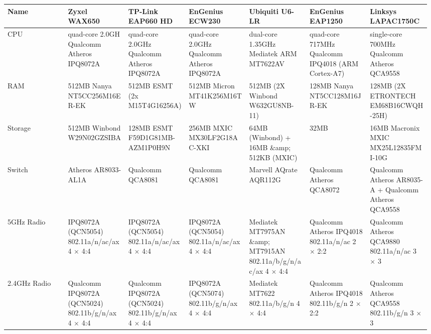 \documentclass[a4paper,12pt]{report}
\begin{document}
\begin{table}[!ht]
  \centering
  \singlespace
  \footnotesize
  \begin{tabular}{*{7}{|p{0.14\linewidth}}|} %
      \hline
      Name &
      Zyxel WAX650 &
      TP-Link EAP660 HD &
      EnGenius ECW230 &
      Ubiquiti U6-LR &
      EnGenius EAP1250 &
      Linksys LAPAC1750C \\

      \hline
      CPU &
      quad-core 2.0GH Qualcomm Atheros IPQ8072A &
      quad-core 2.0GHz Qualcomm Atheros IPQ8072A &
      quad-core 2.0GHz Qualcomm Atheros IPQ8072A &
      dual-core 1.35GHz Mediatek ARM MT7622AV  &
      quad-core 717MHz Qualcomm IPQ4018 (ARM Cortex-A7) &
      single-core 700MHz Qualcomm Atheros QCA9558 \\

      \hline
      RAM &
      512MB Nanya NT5CC256M16ER-EK &
      512MB ESMT (2x M15T4G16256A) &
      512MB Micron MT41K256M16TW &
      512MB (2X Winbond W632GU8NB-11) &
      128MB Nanya NT5CC128M16JR-EK &
      128MB (2X ETRONTECH EM68B16CWQH-25H) \\

      \hline
      Storage &
      512MB Winbond W29N02GZSIBA &
      128MB ESMT F59D1G81MB-AZM1P0H9N &
      256MB MXIC MX30LF2G18AC-XKI &
      64MB (Winbond) + 16MB \&amp; 512KB (MXIC) &
      32MB &
      16MB Macronix MXIC MX25L12835FMI-10G \\

      \hline
      Switch &
      Atheros AR8033-AL1A &
      Qualcomm QCA8081 &
      Qualcomm QCA8081 &
      Marvell AQrate AQR112G &
      Qualcomm Atheros QCA8072 & 
      Qualcomm Atheros AR8035-A + Qualcomm Atheros QCA9558 \\

      \hline
      5GHz Radio & 
      IPQ8072A (QCN5054) 802.11a/n/ac/ax 4 $ \times $ 4:4 &
      IPQ8072A (QCN5054) 802.11a/n/ac/ax 4 $ \times $ 4:4 &
      IPQ8072A (QCN5054) 802.11a/n/ac/ax 4 $ \times $ 4:4 &
      Mediatek MT7975AN \&amp; MT7915AN 802.11a/b/g/n/ac/ax 4 $ \times $ 4:4 &
      Qualcomm Atheros IPQ4018 802.11a/n/ac 2 $ \times $ 2:2 &
      Qualcomm Atheros QCA9880 802.11a/n/ac 3 $ \times $ 3 \\

      \hline
      2.4GHz Radio &
      Qualcomm IPQ8072A (QCN5024) 802.11b/g/n/ax 4 $ \times $ 4:4 &
      Qualcomm IPQ8072A (QCN5024) 802.11b/g/n/ax 4 $ \times $ 4:4 &
      IPQ8072A (QCN5074) 802.11b/g/n/ax 4 $ \times $ 4:4 &
      Mediatek MT7622 802.11a/b/g/n 4 $ \times $ 4:4 &
      Qualcomm Atheros IPQ4018 802.11b/g/n 2 $ \times $ 2:2 &
      Qualcomm Atheros QCA9558 802.11b/g/n 3 $ \times $ 3 \\


\end{tabular}
\end{table}
\end{document}
